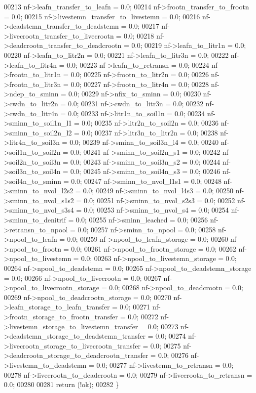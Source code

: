 \begin{DoxyCode}
00213     nf->leafn\_transfer\_to\_leafn = 0.0;
00214     nf->frootn\_transfer\_to\_frootn = 0.0;
00215     nf->livestemn\_transfer\_to\_livestemn = 0.0;
00216     nf->deadstemn\_transfer\_to\_deadstemn = 0.0;
00217     nf->livecrootn\_transfer\_to\_livecrootn = 0.0;
00218     nf->deadcrootn\_transfer\_to\_deadcrootn = 0.0;
00219     nf->leafn\_to\_litr1n = 0.0;
00220     nf->leafn\_to\_litr2n = 0.0;
00221     nf->leafn\_to\_litr3n = 0.0;
00222     nf->leafn\_to\_litr4n = 0.0;
00223     nf->leafn\_to\_retransn = 0.0;
00224     nf->frootn\_to\_litr1n = 0.0;
00225     nf->frootn\_to\_litr2n = 0.0;
00226     nf->frootn\_to\_litr3n = 0.0;
00227     nf->frootn\_to\_litr4n = 0.0;
00228     nf->ndep\_to\_sminn = 0.0; 
00229     nf->nfix\_to\_sminn = 0.0; 
00230     nf->cwdn\_to\_litr2n = 0.0;
00231     nf->cwdn\_to\_litr3n = 0.0;
00232     nf->cwdn\_to\_litr4n = 0.0;
00233     nf->litr1n\_to\_soil1n = 0.0;
00234     nf->sminn\_to\_soil1n\_l1 = 0.0;
00235     nf->litr2n\_to\_soil2n = 0.0;
00236     nf->sminn\_to\_soil2n\_l2 = 0.0;
00237     nf->litr3n\_to\_litr2n = 0.0;
00238     nf->litr4n\_to\_soil3n = 0.0;
00239     nf->sminn\_to\_soil3n\_l4 = 0.0;
00240     nf->soil1n\_to\_soil2n = 0.0;
00241     nf->sminn\_to\_soil2n\_s1 = 0.0;
00242     nf->soil2n\_to\_soil3n = 0.0;
00243     nf->sminn\_to\_soil3n\_s2 = 0.0;
00244     nf->soil3n\_to\_soil4n = 0.0;
00245     nf->sminn\_to\_soil4n\_s3 = 0.0;
00246     nf->soil4n\_to\_sminn = 0.0;
00247     nf->sminn\_to\_nvol\_l1s1 = 0.0;
00248     nf->sminn\_to\_nvol\_l2s2 = 0.0;
00249     nf->sminn\_to\_nvol\_l4s3 = 0.0;
00250     nf->sminn\_to\_nvol\_s1s2 = 0.0;
00251     nf->sminn\_to\_nvol\_s2s3 = 0.0;
00252     nf->sminn\_to\_nvol\_s3s4 = 0.0;
00253     nf->sminn\_to\_nvol\_s4 = 0.0;
00254     nf->sminn\_to\_denitrif = 0.0;
00255     nf->sminn\_leached = 0.0; 
00256     nf->retransn\_to\_npool = 0.0;  
00257     nf->sminn\_to\_npool = 0.0;
00258     nf->npool\_to\_leafn = 0.0;
00259     nf->npool\_to\_leafn\_storage = 0.0;
00260     nf->npool\_to\_frootn = 0.0;
00261     nf->npool\_to\_frootn\_storage = 0.0;
00262     nf->npool\_to\_livestemn = 0.0;
00263     nf->npool\_to\_livestemn\_storage = 0.0;
00264     nf->npool\_to\_deadstemn = 0.0;
00265     nf->npool\_to\_deadstemn\_storage = 0.0;
00266     nf->npool\_to\_livecrootn = 0.0;
00267     nf->npool\_to\_livecrootn\_storage = 0.0;
00268     nf->npool\_to\_deadcrootn = 0.0;
00269     nf->npool\_to\_deadcrootn\_storage = 0.0;
00270     nf->leafn\_storage\_to\_leafn\_transfer = 0.0;
00271     nf->frootn\_storage\_to\_frootn\_transfer = 0.0;
00272     nf->livestemn\_storage\_to\_livestemn\_transfer = 0.0;
00273     nf->deadstemn\_storage\_to\_deadstemn\_transfer = 0.0;
00274     nf->livecrootn\_storage\_to\_livecrootn\_transfer = 0.0;
00275     nf->deadcrootn\_storage\_to\_deadcrootn\_transfer = 0.0;
00276     nf->livestemn\_to\_deadstemn = 0.0;
00277     nf->livestemn\_to\_retransn = 0.0;
00278     nf->livecrootn\_to\_deadcrootn = 0.0;
00279     nf->livecrootn\_to\_retransn = 0.0;
00280     
00281     \textcolor{keywordflow}{return} (!ok);
00282 \}
\end{DoxyCode}
